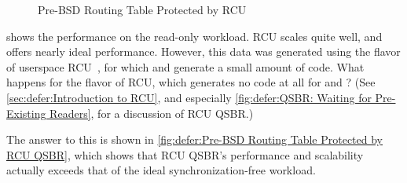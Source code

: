 \begin{figure}
\centering
{}
\caption{Pre-BSD Routing Table Protected by RCU}
\label{fig:defer:Pre-BSD Routing Table Protected by RCU}
\end{figure}

shows the performance on the read-only workload.
RCU scales quite well, and offers nearly ideal performance.
However, this data was generated using the 
flavor of userspace
RCU~\cite{MathieuDesnoyers2009URCU,PaulMcKenney2013LWNURCU},
for which  and 
generate a small amount of code.
What happens for the  flavor of RCU, which generates no code at all
for  and ?
(See \cref{sec:defer:Introduction to RCU},
and especially
\cref{fig:defer:QSBR: Waiting for Pre-Existing Readers},
for a discussion of RCU QSBR\@.)

The answer to this is shown in
\cref{fig:defer:Pre-BSD Routing Table Protected by RCU QSBR},
which shows that RCU QSBR's performance and scalability actually exceeds
that of the ideal synchronization-free workload.

